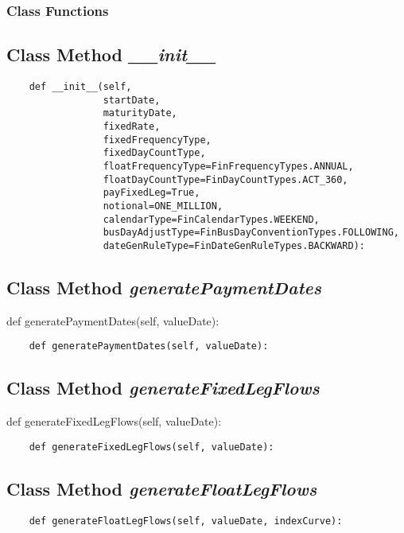 \documentclass[twoside,11pt]{book}
\begin{document}
\subsubsection{Class Functions}

\subsection{Class Method {\it \_\_init\_\_}}


\begin{lstlisting}
    def __init__(self,
                 startDate,
                 maturityDate,
                 fixedRate,
                 fixedFrequencyType,
                 fixedDayCountType,
                 floatFrequencyType=FinFrequencyTypes.ANNUAL,
                 floatDayCountType=FinDayCountTypes.ACT_360,
                 payFixedLeg=True,
                 notional=ONE_MILLION,
                 calendarType=FinCalendarTypes.WEEKEND,
                 busDayAdjustType=FinBusDayConventionTypes.FOLLOWING,
                 dateGenRuleType=FinDateGenRuleTypes.BACKWARD):
\end{lstlisting}

\subsection{Class Method {\it generatePaymentDates}}
def generatePaymentDates(self, valueDate):

\begin{lstlisting}
    def generatePaymentDates(self, valueDate):
\end{lstlisting}

\subsection{Class Method {\it generateFixedLegFlows}}
def generateFixedLegFlows(self, valueDate):

\begin{lstlisting}
    def generateFixedLegFlows(self, valueDate):
\end{lstlisting}

\subsection{Class Method {\it generateFloatLegFlows}}


\begin{lstlisting}
    def generateFloatLegFlows(self, valueDate, indexCurve):
\end{lstlisting}
\end{document}

